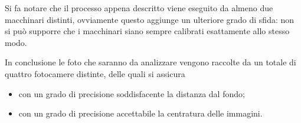 Si fa notare che il processo appena descritto viene eseguito da almeno due macchinari distinti, ovviamente questo aggiunge un ulteriore grado di sfida: non si può supporre che i macchinari siano sempre calibrati esattamente allo stesso modo.

In conclusione le foto che saranno da analizzare vengono raccolte da un totale di quattro fotocamere distinte, delle quali si assicura
\begin{itemize}
  \item con un grado di precisione soddisfacente la distanza dal fondo;
  \item con un grado di precisione accettabile la centratura delle immagini.
\end{itemize}

